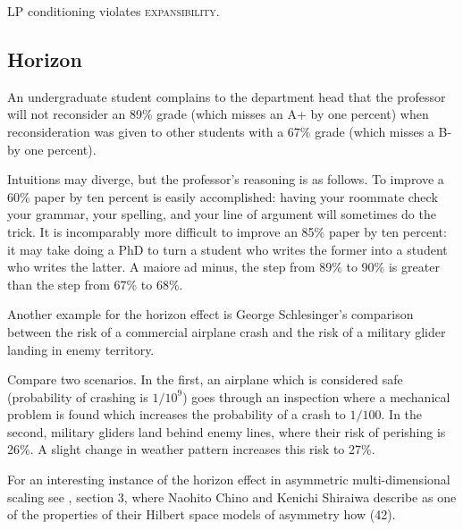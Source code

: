 \documentclass[11pt]{article}
\begin{document}
LP conditioning violates \textsc{expansibility}.

\subsection{Horizon}
\label{Horizon}

\begin{quotex}
  \label{ex:complaint} An
  undergraduate student complains to the department head that the
  professor will not reconsider an 89\% grade (which misses an A+ by
  one percent) when reconsideration was given to other students with a
  67\% grade (which misses a B- by one percent).
\end{quotex}

Intuitions may diverge, but the professor's reasoning is as follows.
To improve a 60\% paper by ten percent is easily accomplished: having
your roommate check your grammar, your spelling, and your line of
argument will sometimes do the trick. It is incomparably more
difficult to improve an 85\% paper by ten percent: it may take doing a
PhD to turn a student who writes the former into a student who writes
the latter. A maiore ad minus, the step from 89\% to 90\% is greater
than the step from 67\% to 68\%.

Another example for the horizon effect is George Schlesinger's
comparison between the risk of a commercial airplane crash and the
risk of a military glider landing in enemy territory.

\begin{quotex}
  \label{ex:schlesinger} Compare two
  scenarios. In the first, an airplane which is considered safe
  (probability of crashing is $1/10^{9}$) goes through an
  inspection where a mechanical problem is found which increases
  the probability of a crash to $1/100$. In the second, military
  gliders land behind enemy lines, where their risk of perishing
  is 26\%. A slight change in weather pattern increases this risk
  to 27\%. 
\end{quotex}

For an interesting instance of the horizon effect in asymmetric
multi-dimen\-sional scaling see , section 3,
where Naohito Chino and Kenichi Shiraiwa describe as one of the
properties of their Hilbert space models of asymmetry how  (42).
\end{document}
